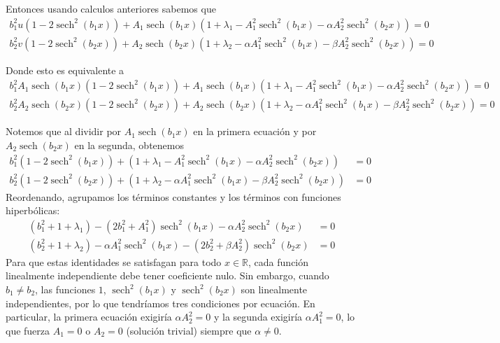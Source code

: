 \documentclass[letterpaper,11pt]{exam}
\newcommand{\sech}{\operatorname{sech}}
\theoremstyle{plain}
\begin{document}
Entonces usando calculos anteriores sabemos que 
\begin{align*}
 b_1^2u(1-2\sech^2(b_1x))+A_1\sech(b_1x)(1+\lambda_1-A_1^2\sech^2(b_1x)-\alpha A_2^2\sech^2(b_2x))=0 \\
b_2^2v(1-2\sech^2(b_2x))+A_2\sech(b_2x)(1+\lambda_2-\alpha A_1^2\sech^2(b_1x)-\beta A_2^2\sech^2(b_2x))=0 
\end{align*}

Donde esto es equivalente a 
\begin{align*}
 b_1^2A_1\sech(b_1x)(1-2\sech^2(b_1x))+A_1\sech(b_1x)(1+\lambda_1-A_1^2\sech^2(b_1x)-\alpha A_2^2\sech^2(b_2x))=0 \\
b_2^2A_2\sech(b_2x)(1-2\sech^2(b_2x))+A_2\sech(b_2x)(1+\lambda_2-\alpha A_1^2\sech^2(b_1x)-\beta A_2^2\sech^2(b_2x))=0 
\end{align*}

Notemos que al dividir por $A_1\sech(b_1 x)$ en la primera ecuación y por 
$A_2\sech(b_2 x)$ en la segunda, obtenemos
\begin{align*}
    b_1^2(1-2\sech^2(b_1x)) + (1+\lambda_1 - A_1^2\sech^2(b_1x) - \alpha A_2^2\sech^2(b_2x)) &= 0 \\
    b_2^2(1-2\sech^2(b_2x)) + (1+\lambda_2 - \alpha A_1^2\sech^2(b_1x) - \beta A_2^2\sech^2(b_2x)) &= 0
\end{align*}
Reordenando, agrupamos los términos constantes y los términos con funciones 
hiperbólicas:
\begin{align*}
    (b_1^2 + 1+\lambda_1) - (2b_1^2 + A_1^2)\sech^2(b_1x) - \alpha A_2^2\sech^2(b_2x) &= 0 \\
    (b_2^2 + 1+\lambda_2) - \alpha A_1^2\sech^2(b_1x) - (2b_2^2 + \beta A_2^2)\sech^2(b_2x) &= 0
\end{align*}
Para que estas identidades se satisfagan para todo $x\in\mathbb{R}$, cada 
función linealmente independiente debe tener coeficiente nulo. Sin embargo, 
cuando $b_1 \neq b_2$, las funciones $1$, $\sech^2(b_1 x)$ y $\sech^2(b_2 x)$ 
son linealmente independientes, por lo que tendríamos tres condiciones por 
ecuación. En particular, la primera ecuación exigiría $\alpha A_2^2 = 0$ y la 
segunda exigiría $\alpha A_1^2 = 0$, lo que fuerza $A_1 = 0$ o $A_2 = 0$ 
(solución trivial) siempre que $\alpha \neq 0$.
\end{document}
